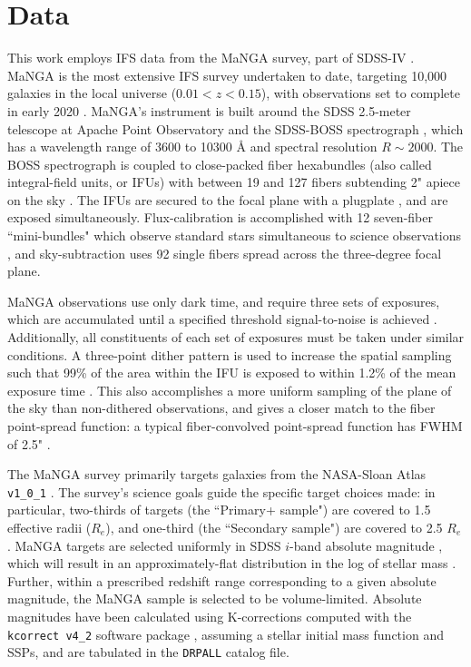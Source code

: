 \section{Data}
\label{chap1:sec:data}

This work employs IFS data from the MaNGA survey, part of SDSS-IV \citep{blanton_17_sdss-iv}. MaNGA is the most extensive IFS survey undertaken to date, targeting 10,000 galaxies in the local universe ($0.01 < z < 0.15$), with observations set to complete in early 2020 \citep{bundy15_manga}. MaNGA's instrument is built around the SDSS 2.5-meter telescope at Apache Point Observatory \citep{gunn_sdss_telescope} and the SDSS-BOSS spectrograph \citep{smee_boss_instrument,sdss_boss_dawson_13}, which has a wavelength range of 3600 to 10300 $\mbox{\AA}$ and spectral resolution $R \sim 2000$. The BOSS spectrograph is coupled to close-packed fiber hexabundles (also called integral-field units, or IFUs) with between 19 and 127 fibers subtending 2" apiece on the sky \citep{manga_inst}. The IFUs are secured to the focal plane with a plugplate \citep{sdss_summary}, and are exposed simultaneously. Flux-calibration is accomplished with 12 seven-fiber ``mini-bundles" which observe standard stars simultaneous to science observations \citep{manga_spectrophot}, and sky-subtraction uses 92 single fibers spread across the three-degree focal plane.

MaNGA observations use only dark time, and require three sets of exposures, which are accumulated until a specified threshold signal-to-noise is achieved \citep{manga_progress_yan_16}. Additionally, all constituents of each set of exposures must be taken under similar conditions. A three-point dither pattern is used to increase the spatial sampling such that 99\% of the area within the IFU is exposed to within 1.2\% of the mean exposure time \citep{manga_obs}. This also accomplishes a more uniform sampling of the plane of the sky than non-dithered observations, and gives a closer match to the fiber point-spread function: a typical fiber-convolved point-spread function has FWHM of 2.5" \citep{manga_obs}.

The MaNGA survey primarily targets galaxies from the NASA-Sloan Atlas \texttt{v1\_0\_1} \citep[NSA, ][]{blanton_11_nsa}. The survey's science goals guide the specific target choices made: in particular, two-thirds of targets (the ``Primary+ sample") are covered to 1.5 effective radii ($R_e$), and one-third (the ``Secondary sample") are covered to 2.5 $R_e$. MaNGA targets are selected uniformly in SDSS $i$-band absolute magnitude \citep{fukugita_96_sdss_photo, doi_2010_sdssresponse}, which will result in an approximately-flat distribution in the log of stellar mass \citep{manga_sample_wake_17}. Further, within a prescribed redshift range corresponding to a given absolute magnitude, the MaNGA sample is selected to be volume-limited. Absolute magnitudes have been calculated using K-corrections computed with the \texttt{kcorrect v4\_2} software package \citep{blanton_roweis_07}, assuming a \citet{chabrier03} stellar initial mass function and \citet{BC03} SSPs, and are tabulated in the \texttt{DRPALL} catalog file.

